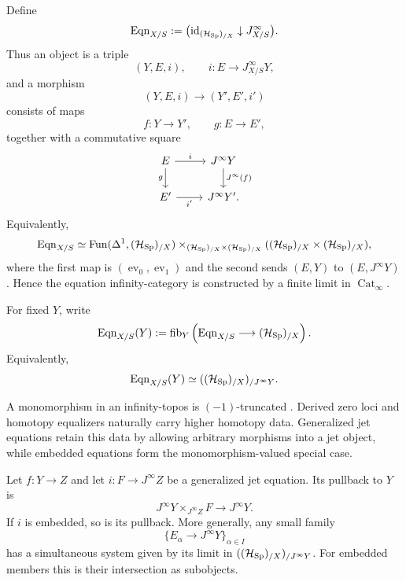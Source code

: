 \begin{construction}
\label{con:equation-category}
Define
\[
  \operatorname{Eqn}_{X/S}
  :=
  \bigl(\operatorname{id}_{(\mathcal H_{\operatorname{Sp}})_{/X}}\downarrow J^\infty_{X/S}\bigr).
\]
Thus an object is a triple
\[
  (Y,E,i),
  \qquad
  i:E\longrightarrow J^\infty_{X/S}Y,
\]
and a morphism
\[
  (Y,E,i)\longrightarrow(Y',E',i')
\]
consists of maps
\[
  f:Y\to Y',
  \qquad
  g:E\to E',
\]
together with a commutative square
\[
\begin{tikzcd}
E \ar[r,"i"] \ar[d,"g"']
  & J^\infty Y \ar[d,"J^\infty(f)"]\\
E' \ar[r,"i'"']
  & J^\infty Y'.
\end{tikzcd}
\]
Equivalently,
\[
  \operatorname{Eqn}_{X/S}
  \simeq
  \operatorname{Fun}(\Delta^1,(\mathcal H_{\operatorname{Sp}})_{/X})
  \times_{(\mathcal H_{\operatorname{Sp}})_{/X}\times(\mathcal H_{\operatorname{Sp}})_{/X}}
  ((\mathcal H_{\operatorname{Sp}})_{/X}\times(\mathcal H_{\operatorname{Sp}})_{/X}),
\]
where the first map is
\((\operatorname{ev}_0,\operatorname{ev}_1)\) and the second sends
\((E,Y)\) to \((E,J^\infty Y)\). Hence the equation infinity-category is
constructed by a finite limit in \(\operatorname{Cat}_\infty\).

For fixed \(Y\), write
\[
  \operatorname{Eqn}_{X/S}(Y)
  :=
  \operatorname{fib}_Y
  \left(
    \operatorname{Eqn}_{X/S}
    \longrightarrow
    (\mathcal H_{\operatorname{Sp}})_{/X}
  \right).
\]
Equivalently,
\[
  \operatorname{Eqn}_{X/S}(Y)
  \simeq
  ((\mathcal H_{\operatorname{Sp}})_{/X})_{/J^\infty Y}.
\]
\end{construction}

\begin{remark}
A monomorphism in an infinity-topos is \((-1)\)-truncated
\cite{LurieHTT}. Derived zero loci and homotopy equalizers naturally carry
higher homotopy data. Generalized jet equations retain this data by allowing
arbitrary morphisms into a jet object, while embedded equations form the
monomorphism-valued special case.
\end{remark}

\begin{proposition}
Let \(f:Y\to Z\) and let \(i:F\to J^\infty Z\) be a generalized jet equation. Its
pullback to \(Y\) is
\[
  J^\infty Y\times_{J^\infty Z}F
  \longrightarrow
  J^\infty Y.
\]
If \(i\) is embedded, so is its pullback. More generally, any small family
\[
  \{E_\alpha\to J^\infty Y\}_{\alpha\in I}
\]
has a simultaneous system given by its limit in
\(((\mathcal H_{\operatorname{Sp}})_{/X})_{/J^\infty Y}\). For embedded members this is their
intersection as subobjects.
\end{proposition}


